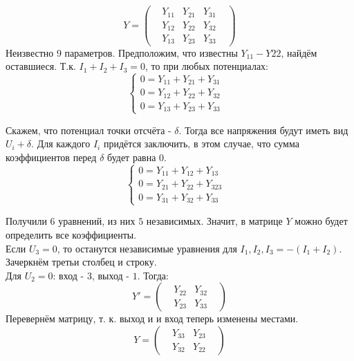 \documentclass[a4paper,12pt]{report}
\begin{document}
  \begin{equation}
  Y=\left(
\begin{aligned}
& Y_{11} & Y_{21} & Y_{31}&\\
& Y_{12} & Y_{22} & Y_{32}&\\
& Y_{13} & Y_{23} & Y_{33}&
\end{aligned}
\right)
\end{equation}
Неизвестно 9 параметров. Предположим, что известны $Y_{11}-Y{22}$, найдём оставшиеся. Т.к. $I_1+I_2+I_3=0$, то при любых потенциалах:
  \begin{equation}
  \left\{
\begin{aligned}
0=Y_{11}+Y_{21}+Y_{31}&\\
0=Y_{12}+Y_{22}+Y_{32}&\\
0=Y_{13}+Y_{23}+Y_{33}&
\end{aligned}
\right.
\end{equation}

Скажем, что потенциал точки отсчёта - $\delta$. Тогда все напряжения будут иметь вид $U_i+\delta$. Для каждого $I_i$ придётся заключить, в этом случае, что сумма коэффициентов перед $\delta$ будет равна $0$.
  \begin{equation}
  \left\{
\begin{aligned}
0=Y_{11}+Y_{12}+Y_{13}&\\
0=Y_{21}+Y_{22}+Y_{323}&\\
0=Y_{31}+Y_{32}+Y_{33}&
\end{aligned}
\right.
\end{equation}

Получили $6$ уравнений, из них $5$ независимых. Значит, в матрице $Y$ можно будет определить все коэффициенты.\\
Если $U_3=0$, то останутся независимые уравнения для $I_1, I_2, I_3=-(I_1+I_2)$. Зачеркнём третьи столбец и строку.\\
Для $U_2=0$: вход - $3$, выход - $1$. Тогда:
\begin{equation}
  Y'=\left(
\begin{aligned}
& Y_{22} & Y_{32}&\\
& Y_{23} & Y_{33}&
\end{aligned}
\right)
\end{equation}
Перевернём матрицу, т. к. выход и и вход теперь изменены местами.
\begin{equation}
 Y =\left(
\begin{aligned}
&Y_{33} & Y_{23}&\\
&Y_{32}& Y_{22}&
\end{aligned}
\right)
\end{equation}
\end{document}
